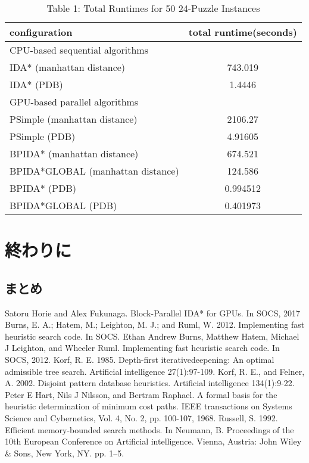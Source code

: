 \documentclass[a4paper,11pt,oneside,openany]{jsbook}
\begin{document}
\begin{table}[]
\centering
\caption{Table 1: Total Runtimes for 50 24-Puzzle Instances}
\label{my-label}
\begin{tabular}{|l|c|}
\hline
configuration & \multicolumn{1}{l|}{total runtime(seconds)} \\ \hline
\multicolumn{2}{|l|}{CPU-based sequential algorithms} \\ \hline
IDA* (manhattan distance) & 743.019 \\
IDA* (PDB) & 1.4446 \\ \hline
\multicolumn{2}{|l|}{GPU-based parallel algorithms} \\ \hline
PSimple (manhattan distance) & 2106.27 \\
PSimple (PDB) & 4.91605 \\
BPIDA* (manhattan distance) & 674.521 \\
BPIDA*GLOBAL (manhattan distance) & 124.586 \\
BPIDA* (PDB) & 0.994512 \\
BPIDA*GLOBAL (PDB) & 0.401973 \\ \hline
\end{tabular}
\end{table}

\chapter{終わりに}
\section{まとめ}



\begin{thebibliography}{10}
   Satoru Horie and Alex Fukunaga. Block-Parallel IDA* for GPUs. In SOCS, 2017 
   Burns, E. A.; Hatem, M.; Leighton,  M. J.; and Ruml, W. 2012. Implementing fast heuristic search code. In SOCS.
  Ethan Andrew Burns, Matthew Hatem, Michael J Leighton, and Wheeler Ruml. Implementing fast heuristic search code. In SOCS, 2012.
  Korf, R. E. 1985. Depth-first iterativedeepening: An optimal admissible tree search. Artificial intelligence 27(1):97-109.
  Korf, R. E., and Felner, A. 2002. Disjoint pattern database heuristics. Artificial intelligence 134(1):9-22.
  Peter E Hart, Nils J Nilsson, and Bertram Raphael. A formal basis for the heuristic determination of minimum cost paths. IEEE transactions on Systems Science and Cybernetics, Vol. 4, No. 2, pp. 100-107, 1968. 
  Russell, S. 1992. Efficient memory-bounded search methods. In Neumann, B. Proceedings of the 10th European Conference on Artificial intelligence. Vienna, Austria: John Wiley \& Sons, New York, NY. pp. 1–5.

\end{thebibliography}
\end{document}
